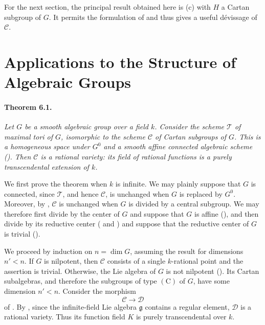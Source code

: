 For the next section, the principal result obtained here is
\textup{(c)} with \(H\) a Cartan subgroup of \(G\). It permits
the formulation of  and thus gives a useful dévissage of
\(\mathcal C\).



\section{Applications to the Structure of Algebraic Groups}

\paragraph{\textbf{Theorem 6.1.}}
{\itshape Let \(G\) be a smooth algebraic group over a field
\(k\). Consider the scheme \(\mathcal T\) of maximal tori of
\(G\), isomorphic to the scheme \(\mathcal C\) of Cartan
subgroups of \(G\). This is a homogeneous space under \(G^0\) and
a smooth affine connected algebraic scheme
\textup{(\textup{})}. Then \(\mathcal C\) is a rational
variety: its field of rational functions is a purely
transcendental extension of \(k\).}

We first prove the theorem when \(k\) is infinite. We may plainly
suppose that \(G\) is connected, since \(\mathcal T\), and hence
\(\mathcal C\), is unchanged when \(G\) is replaced by \(G^0\).
Moreover, by , \(\mathcal C\) is unchanged when \(G\) is
divided by a central subgroup. We may therefore first divide by
the center of \(G\) and suppose that \(G\) is affine
\textup{()}, and then divide by its reductive center
\textup{( and )} and suppose that the reductive center
of \(G\) is trivial \textup{(\textup{})}.

We proceed by induction on \(n=\dim G\), assuming the result for
dimensions \(n'<n\). If \(G\) is nilpotent, then \(\mathcal C\)
consists of a single \(k\)-rational point and the assertion is
trivial. Otherwise, the Lie algebra of \(G\) is not nilpotent
\textup{()}. Its Cartan subalgebras, and therefore the
subgroups of type \((\mathrm C)\) of \(G\), have some dimension
\(n'<n\). Consider the morphism
\[
  \mathcal C\longrightarrow\mathcal D
\]
of . By , since the infinite-field Lie algebra
\(\mathfrak g\) contains a regular element, \(\mathcal D\) is a
rational variety. Thus its function field \(K\) is purely
transcendental over \(k\).

